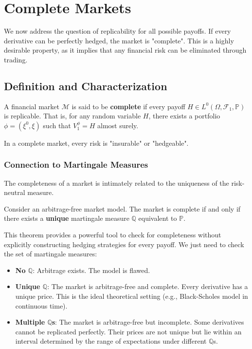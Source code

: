\chapter{Complete Markets}

We now address the question of replicability for all possible payoffs. If every derivative can be perfectly hedged, the market is "complete". This is a highly desirable property, as it implies that any financial risk can be eliminated through trading.

\section{Definition and Characterization}

\begin{definition}
A financial market $\mathcal{M}$ is said to be \textbf{complete} if every payoff $H \in L^0(\Omega, \mathcal{F}_1, \mathbb{P})$ is replicable.
That is, for any random variable $H$, there exists a portfolio $\phi = (\xi^0, \xi)$ such that $V_1^\phi = H$ almost surely.
\end{definition}

In a complete market, every risk is "insurable" or "hedgeable".

\subsection{Connection to Martingale Measures}
The completeness of a market is intimately related to the uniqueness of the risk-neutral measure.

\begin{theorem}
Consider an arbitrage-free market model. The market is complete if and only if there exists a \textbf{unique} martingale measure $\mathbb{Q}$ equivalent to $\mathbb{P}$.
\end{theorem}

This theorem provides a powerful tool to check for completeness without explicitly constructing hedging strategies for every payoff. We just need to check the set of martingale measures:
\begin{itemize}
    \item \textbf{No $\mathbb{Q}$}: Arbitrage exists. The model is flawed.
    \item \textbf{Unique $\mathbb{Q}$}: The market is arbitrage-free and complete. Every derivative has a unique price. This is the ideal theoretical setting (e.g., Black-Scholes model in continuous time).
    \item \textbf{Multiple $\mathbb{Q}$s}: The market is arbitrage-free but incomplete. Some derivatives cannot be replicated perfectly. Their prices are not unique but lie within an interval determined by the range of expectations under different $\mathbb{Q}$s.
\end{itemize}

